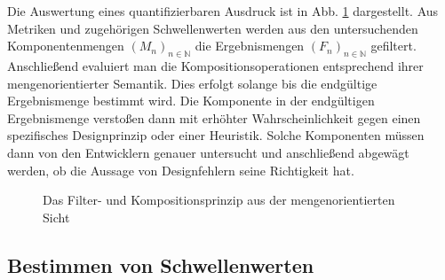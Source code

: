 \documentclass[12pt]{article}
\begin{document}
Die Auswertung eines quantifizierbaren Ausdruck ist in Abb.
\ref{fig:filter} dargestellt. Aus Metriken und zugehörigen
Schwellenwerten werden aus den untersuchenden Komponentenmengen
$\left( M_{n} \right)_{n \in \mathbb{N}}$ die Ergebnismengen
$\left( F_{n}\right)_{n \in \mathbb{N}}$ gefiltert. Anschließend
evaluiert man die Kompositionsoperationen entsprechend ihrer
mengenorientierter Semantik. Dies erfolgt solange bis die
endgültige Ergebnismenge bestimmt wird. Die Komponente in der
endgültigen Ergebnismenge verstoßen dann mit erhöhter
Wahrscheinlichkeit gegen einen spezifisches Designprinzip oder
einer Heuristik.  Solche Komponenten müssen dann von den
Entwicklern genauer untersucht und anschließend abgewägt werden,
ob die Aussage von Designfehlern seine Richtigkeit hat.
\begin{figure} 
  \centering
  \caption{Das Filter- und Kompositionsprinzip aus der
          mengenorientierten Sicht \cite{Mar04}}
  \label{fig:filter}
\end{figure}

\subsection{Bestimmen von Schwellenwerten}
\end{document}
